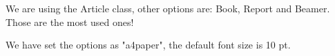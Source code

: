 \documentclass[a4paper]{article} %
\begin{document}
	 We are using the Article class, other options are: Book, Report and Beamer. Those are the most used ones!
	
	We have set the options as "a4paper", the default font size is 10 pt.
\end{document}
